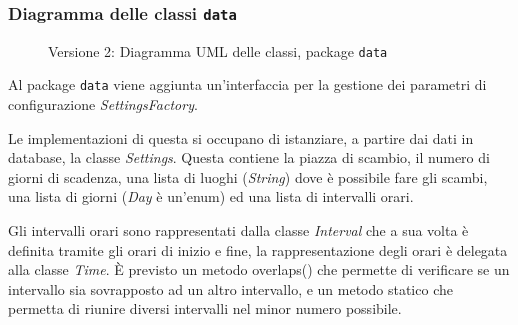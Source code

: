 \subsubsection{Diagramma delle classi \texttt{data}}
\vspace{0.5cm}
\begin{figure}[H]
    \centering
    \caption{Versione 2: Diagramma UML delle classi, package \texttt{data}}
    \label{fig:class_data_v_2}
\end{figure}

Al package \texttt{data} viene aggiunta un'interfaccia per la gestione dei parametri di configurazione \textit{SettingsFactory}.

Le implementazioni di questa si occupano di istanziare, a partire dai dati in database, la classe \textit{Settings}.
Questa contiene la piazza di scambio, il numero di giorni di scadenza, una lista di luoghi (\textit{String}) dove è possibile fare gli scambi,
una lista di giorni (\textit{Day} è un'enum) ed una lista di intervalli orari.

Gli intervalli orari sono rappresentati dalla classe \textit{Interval} che a sua volta è definita tramite gli orari di inizio e fine, la rappresentazione
degli orari è delegata alla classe \textit{Time}. È previsto un metodo overlaps() che permette di verificare se un intervallo sia sovrapposto
ad un altro intervallo, e un metodo statico che permetta di riunire diversi intervalli nel minor numero possibile.